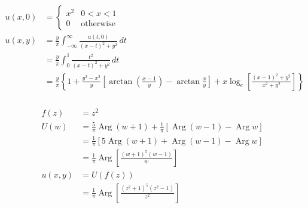 \documentclass{article}
\newcommand{\Arg}{\operatorname{Arg}}
\begin{document}
\begin{align*}
  u(x, 0) & = \begin{cases}
                x^2 & 0 < x < 1        \\
                0   & \text{otherwise}
              \end{cases}                                                                                                                                                                         \\
  u(x, y) & = \frac{y}{\pi} \int_{-\infty}^\infty \frac{u(t, 0)}{(x - t)^2 + y^2} \,d t                                                                                                                      \\
          & = \frac{y}{\pi} \int_0^1 \frac{t^2}{(x - t)^2 + y^2} \,d t                                                                                                                                       \\
          & = \frac{y}{\pi} \left\{ 1 + \frac{y^2 - x^2}{y} \left[ \arctan \left( \frac{x - 1}{y} \right) - \arctan \frac{x}{y} \right] + x \log_e \left[ \frac{(x - 1)^2 + y^2}{x^2 + y^2} \right] \right\}
\end{align*}

\setcounter{subsubsection}{6}
\subsubsection{}

\begin{align*}
  f(z)    & = z^2                                                                 \\
  U(w)    & = \frac{5}{\pi} \Arg (w + 1) + \frac{1}{\pi} [\Arg (w - 1) - \Arg w]  \\
          & = \frac{1}{\pi} [5 \Arg (w + 1) + \Arg (w - 1) - \Arg w]              \\
          & = \frac{1}{\pi} \Arg \left[ \frac{(w + 1)^5 (w - 1)}{w} \right]       \\
  u(x, y) & = U(f(z))                                                             \\
          & = \frac{1}{\pi} \Arg \left[ \frac{(z^2 + 1)^5 (z^2 - 1)}{z^2} \right] \\
\end{align*}
\end{document}
